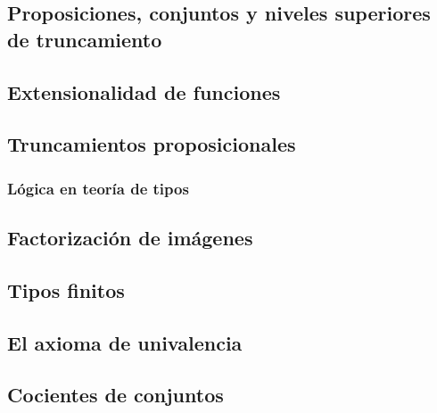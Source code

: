 \documentclass{article}
\begin{document}
\subsection{Proposiciones, conjuntos y niveles superiores de truncamiento}
\subsection{Extensionalidad de funciones}
\subsection{Truncamientos proposicionales}
\subsubsection{Lógica en teoría de tipos}
\subsection{Factorización de imágenes}
\subsection{Tipos finitos}
\subsection{El axioma de univalencia}
\subsection{Cocientes de conjuntos}



\end{document}
